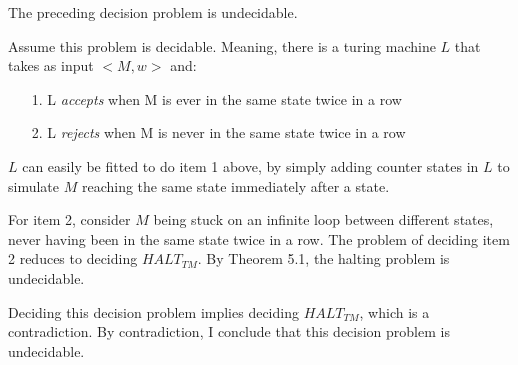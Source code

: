 
\vskip 0.3in


\vskip 0.1in

\noindent The preceding decision problem is undecidable.

\vskip 0.1in


\noindent Assume this problem is decidable. Meaning, there is a turing machine $L$ that takes as input $<M, w>$ and:

\begin{itemize}
    \item[1.] L \textit{accepts} when M is ever in the same state twice in a row
    \item[2.] L \textit{rejects} when M is never in the same state twice in a row
\end{itemize}

\noindent $L$ can easily be fitted to do item 1 above, by simply adding counter states in $L$ to simulate $M$ reaching the same state immediately after a state.

\vskip 0.1in

\noindent For item 2, consider $M$ being stuck on an infinite loop between different states, never having been in the same state twice in a row.
The problem of deciding item 2 reduces to deciding $HALT_{TM}$. By Theorem 5.1, the halting problem is undecidable.

\vskip 0.1in

\noindent Deciding this decision problem implies deciding $HALT_{TM}$, which is a contradiction. By contradiction, I conclude that this
decision problem is undecidable.
